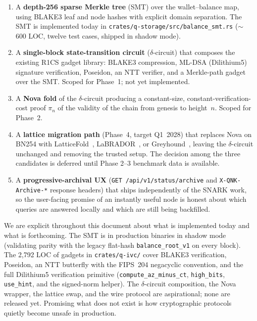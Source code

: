 \documentclass[11pt,a4paper]{article}
\begin{document}
\begin{enumerate}[label=(\arabic*),leftmargin=*]
  \item A \textbf{depth-256 sparse Merkle tree} (SMT) over the wallet--balance map,
        using BLAKE3 leaf and node hashes with explicit domain separation. The SMT
        is implemented today in \texttt{crates/q-storage/src/balance\_smt.rs}
        ($\sim$600 LOC, twelve test cases, shipped in shadow mode).
  \item A \textbf{single-block state-transition circuit} ($\delta$-circuit) that
        composes the existing R1CS gadget library:
        BLAKE3 compression, ML-DSA (Dilithium5) signature
        verification, Poseidon, an NTT verifier, and a Merkle-path gadget over the SMT.
        Scoped for Phase~1; not yet implemented.
  \item A \textbf{Nova fold} of the $\delta$-circuit producing a constant-size,
        constant-verification-cost proof $\pi_n$ of the validity of the chain
        from genesis to height~$n$. Scoped for Phase~2.
  \item A \textbf{lattice migration path} (Phase~4, target Q1~2028) that
        replaces Nova on BN254 with LatticeFold~\cite{BonehChenTairi2024LatticeFold},
        LaBRADOR~\cite{BeullensSeiler2023LaBRADOR}, or
        Greyhound~\cite{NguyenSeiler2024Greyhound}, leaving the
        $\delta$-circuit unchanged and removing the trusted setup. The decision
        among the three candidates is deferred until Phase 2--3 benchmark data
        is available.
  \item A \textbf{progressive-archival UX} (\texttt{GET /api/v1/status/archive}
        and \texttt{X-QNK-Archive-*} response headers) that ships independently
        of the SNARK work, so the user-facing promise of an instantly useful
        node is honest about which queries are answered locally and which are
        still being backfilled.
\end{enumerate}

We are explicit throughout this document about what is implemented today and
what is forthcoming. The SMT is in production binaries in shadow mode (validating
parity with the legacy flat-hash \texttt{balance\_root\_v1} on every block).
The 2{,}792 LOC of gadgets in \texttt{crates/q-ivc/} cover BLAKE3 verification,
Poseidon, an NTT butterfly with the FIPS~204 negacyclic convention, and the full
Dilithium5 verification primitive (\texttt{compute\_az\_minus\_ct},
\texttt{high\_bits}, \texttt{use\_hint}, and the signed-norm helper). The
$\delta$-circuit composition, the Nova wrapper, the lattice swap, and the wire
protocol are aspirational; none are released yet. Promising what does not exist
is how cryptographic protocols quietly become unsafe in production.
\end{document}
